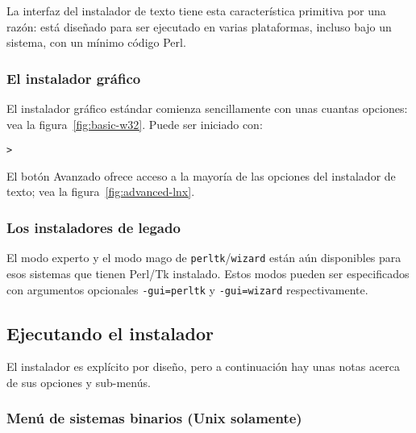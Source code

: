 \documentclass{article}
\begin{document}
La interfaz del instalador de texto tiene esta
característica primitiva por una razón: está diseñado para
ser ejecutado en varias plataformas, incluso bajo un
sistema, con un mínimo código Perl. 

\subsubsection{El instalador gráfico}
\label{sec:graphical-inst}

El instalador gráfico estándar comienza sencillamente con
unas cuantas opciones: vea la figura~\ref{fig:basic-w32}.
Puede ser iniciado con:
\begin{alltt}
	> 
\end{alltt}

El botón Avanzado ofrece acceso a la mayoría de las opciones
del instalador de texto;  vea la
figura~\ref{fig:advanced-lnx}.

\subsubsection{Los instaladores de legado}

El modo experto y el modo mago de
\texttt{perltk}/\texttt{wizard} están aún disponibles para
esos sistemas que tienen Perl/Tk instalado. Estos modos
pueden ser especificados con argumentos opcionales
\texttt{-gui=perltk} y \texttt{-gui=wizard} respectivamente.

\subsection{Ejecutando el instalador}
\label{sec:runinstall}

El instalador es explícito por diseño, pero a continuación hay unas
notas acerca de sus opciones y sub-menús. 

\subsubsection{Menú de sistemas binarios (Unix solamente)}
\label{sec:binary}
\end{document}
